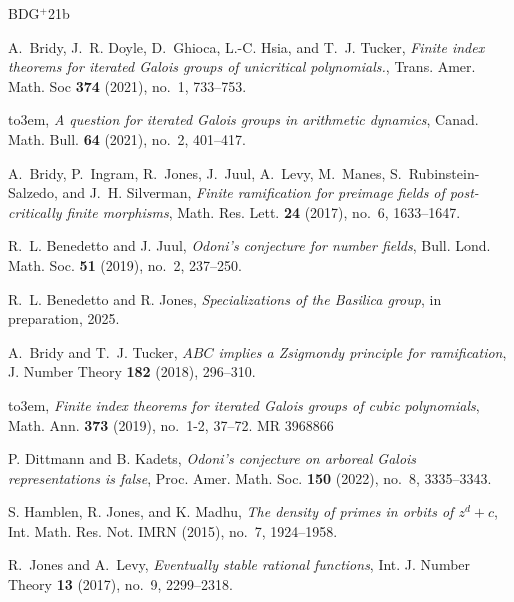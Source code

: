 \newcommand{\etalchar}[1]{$^{#1}$}
\providecommand{\bysame}{\leavevmode\hbox to3em{\hrulefill}\thinspace}
\providecommand{\MR}{\relax\ifhmode\unskip\space\fi MR }
\providecommand{\MRhref}[2]{%
  \href{http://www.ams.org/mathscinet-getitem?mr=#1}{#2}
}
\providecommand{\href}[2]{#2}
\begin{thebibliography}{BDG{\etalchar{+}}21b}

\bibitem[BDG{\etalchar{+}}21a]{Uni1}
A.~Bridy, J.~R. Doyle, D.~Ghioca, L.-C. Hsia, and T.~J. Tucker, \emph{Finite
  index theorems for iterated {G}alois groups of unicritical polynomials.},
  Trans. Amer. Math. Soc \textbf{374} (2021), no.~1, 733--753.

\bibitem[BDG{\etalchar{+}}21b]{Conjecture}
\bysame, \emph{A question for iterated {G}alois groups in arithmetic dynamics},
  Canad. Math. Bull. \textbf{64} (2021), no.~2, 401--417.

\bibitem[BIJ{\etalchar{+}}17]{BIJJ}
A.~Bridy, P.~Ingram, R.~Jones, J.~Juul, A.~Levy, M.~Manes,
  S.~Rubinstein-Salzedo, and J.~H. Silverman, \emph{Finite ramification for
  preimage fields of post-critically finite morphisms}, Math. Res. Lett.
  \textbf{24} (2017), no.~6, 1633--1647.

R.~L. Benedetto and J. Juul, \emph{Odoni's conjecture for number
  fields}, Bull. Lond. Math. Soc. \textbf{51} (2019), no.~2, 237--250.

R.~L. Benedetto and R. Jones, \emph{Specializations of the {B}asilica
  group}, in preparation, 2025.  


A.~Bridy and T.~J. Tucker, \emph{{$ABC$} implies a {Z}sigmondy principle for
  ramification}, J. Number Theory \textbf{182} (2018), 296--310.

\bysame, \emph{Finite index theorems for iterated {G}alois groups of cubic
  polynomials}, Math. Ann. \textbf{373} (2019), no.~1-2, 37--72. \MR{3968866}

P. Dittmann and B. Kadets, \emph{Odoni's conjecture on arboreal {G}alois
  representations is false}, Proc. Amer. Math. Soc. \textbf{150} (2022), no.~8,
  3335--3343.

S. Hamblen, R. Jones, and K. Madhu, \emph{The density of primes in
  orbits of {$z^d+c$}}, Int. Math. Res. Not. IMRN (2015), no.~7, 1924--1958.

R.~Jones and A.~Levy, \emph{Eventually stable rational functions}, Int. J.
  Number Theory \textbf{13} (2017), no.~9, 2299--2318.


\end{thebibliography}
